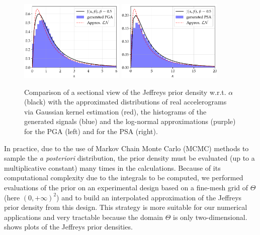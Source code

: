        \begin{figure}[!ht]
        \centering
        {\includegraphics[width=5cm]{figures/PREM/PGAjeff.pdf}}
        {\includegraphics[width=5cm]{figures/PREM/PSAjeff.pdf}}        
        \caption{Comparison of a sectional view of the Jeffreys prior density w.r.t. $\alpha$ (black) with the approximated distributions of real accelerograms via Gaussian kernel estimation (red), the histograms of the generated signals (blue) and the log-normal approximations (purple) for the PGA (left) and for the PSA (right).}
         \label{uncIM:fig:IM}
    \end{figure}



  


        
        In practice, due to the use of Markov Chain Monte Carlo (MCMC) methods to sample the \emph{a posteriori} distribution, the prior density must be evaluated (up to a multiplicative constant) many times in the calculations. Because of its computational complexity due to the integrals to be computed, we performed evaluations of the prior on an experimental design based on a fine-mesh grid of $\Theta$ (here $(0,+\infty)^2$) and to build an interpolated approximation of the Jeffreys prior density from this design. This strategy is more suitable for our numerical applications and very tractable because the domain $\Theta$ is only two-dimensional.  shows plots of the Jeffreys prior densities. 
        
